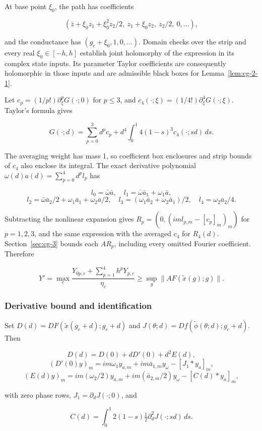 \documentclass[11pt]{article}
\theoremstyle{definition}
\begin{document}
At base point $\xi_0$, the path has coefficients

\[
 (\bar z+\xi_0z_1+\xi_0^2z_2/2,\ z_1+\xi_0z_2,\ z_2/2,\ 0,\ldots),
\]

and the conductance has $(g_c+\xi_0,1,0,\ldots)$. Domain checks over the strip and every real $\xi_0\in[-h,h]$ establish joint holomorphy of the expression in its complex state inputs. Its parameter Taylor coefficients are consequently holomorphic in those inputs and are admissible black boxes for Lemma~\ref{lem:cg-2-1}.

Let $c_p=(1/p!)\partial_\xi^pG(\cdot;0)$ for $p\le3$, and $c_4(\cdot;\xi)=(1/4!)\partial_\xi^4G(\cdot;\xi)$. Taylor's formula gives

\[
 G(\cdot;d)=\sum_{p=0}^3d^pc_p
 +d^4\int_0^1 4(1-s)^3c_4(\cdot;sd)\,ds.
\]

The averaging weight has mass 1, so coefficient box enclosures and strip bounds of $c_4$ also enclose its integral. The exact derivative polynomial $\omega(d)a(d)=\sum_{p=0}^4d^pl_p$ has

\[
 l_0=\bar\omega\bar a,\quad l_1=\bar\omega\bar a_1+\omega_1\bar a,
\]
\[
 l_2=\bar\omega\bar a_2/2+\omega_1\bar a_1+\omega_2\bar a/2,
 \quad l_3=(\omega_1\bar a_2+\omega_2\bar a_1)/2,
 \quad l_4=\omega_2\bar a_2/4.
\]

Subtracting the nonlinear expansion gives $R_p=(0,(iml_{p,m}-[c_p]_m)_m)$ for $p=1,2,3$, and the same expression with the averaged $c_4$ for $R_4(d)$. Section~\ref{sec:cg-3} bounds each $AR_p$, including every omitted Fourier coefficient. Therefore

\[
 Y'=\max_c\frac{Y_{0p,c}+\sum_{p=1}^4h^pY_{p,c}}{\eta_c}
 \ge\sup_g\|AF(\widetilde x(g);g)\|.
\]

\subsubsection{Derivative bound and identification}\label{sec:cg-5-2}

Set $D(d)=DF(\widetilde x(g_c+d);g_c+d)$ and $J(\theta;d)=Df(\widetilde\phi(\theta;d);g_c+d)$. Then

\[
 D(d)=D(0)+dD'(0)+d^2E(d),
\]
\[
 (D'(0)y)_m=im\omega_1y_{a,m}+im\bar a_{1,m}y_\omega-[J_1*y_a]_m,
\]
\[
 (E(d)y)_m=im(\omega_2/2)y_{a,m}+im(\bar a_{2,m}/2)y_\omega-[C(d)*y_a]_m,
\]

with zero phase rows, $J_1=\partial_dJ(\cdot;0)$, and

\[
 C(d)=\int_0^1 2(1-s)\tfrac12\partial_d^2J(\cdot;sd)\,ds.
\]
\end{document}
